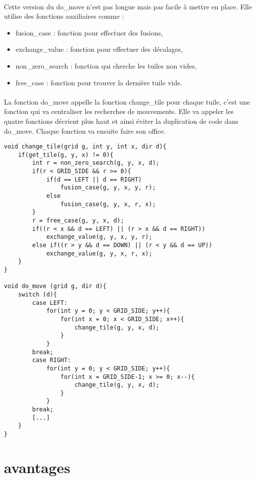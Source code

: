 \documentclass{report}
\begin{document}
\paragraph{}Cette version du do{\_}move n'est pas longue mais pas facile à mettre en place. Elle utilise des fonctions auxiliaires comme :
\begin{itemize}
\item fusion{\_}case : fonction pour effectuer des fusions,
\item exchange{\_}value : fonction pour effectuer des décalages,
\item  non{\_}zero{\_}search : fonction qui cherche les tuiles non vides,
\item free{\_}case : fonction pour trouver la dernière tuile vide.
\end{itemize}

\paragraph{}La fonction do{\_}move appelle la fonction change{\_}tile pour chaque tuile, c'est une fonction qui va centraliser les recherches de mouvements. Elle va appeler les quatre fonctions décrient plus haut et ainsi éviter la duplication de code dans do{\_}move. Chaque fonction va ensuite faire son office.

\begin{lstlisting}
void change_tile(grid g, int y, int x, dir d){
	if(get_tile(g, y, x) != 0){
		int r = non_zero_search(g, y, x, d);
		if(r < GRID_SIDE && r >= 0){
			if(d == LEFT || d == RIGHT)
				fusion_case(g, y, x, y, r);
			else
				fusion_case(g, y, x, r, x); 
		}
		r = free_case(g, y, x, d);
		if((r < x && d == LEFT) || (r > x && d == RIGHT))
			exchange_value(g, y, x, y, r);
		else if((r > y && d == DOWN) || (r < y && d == UP))
			exchange_value(g, y, x, r, x); 
	}
}

void do_move (grid g, dir d){
	switch (d){
		case LEFT:
			for(int y = 0; y < GRID_SIDE; y++){
				for(int x = 0; x < GRID_SIDE; x++){
					change_tile(g, y, x, d);
				}
			}
		break;
		case RIGHT:
			for(int y = 0; y < GRID_SIDE; y++){
				for(int x = GRID_SIDE-1; x >= 0; x--){
					change_tile(g, y, x, d);
				}
			}
		break;
		[...]
	}
}
\end{lstlisting}

\section{avantages}
\end{document}
